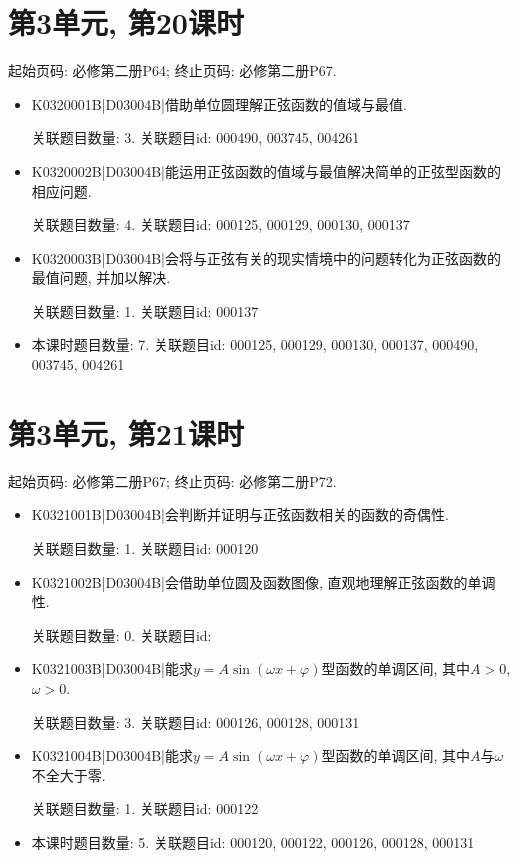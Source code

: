 \section*{第3单元, 第20课时}
起始页码: 必修第二册P64; 终止页码: 必修第二册P67.
\begin{itemize}
\item K0320001B|D03004B|借助单位圆理解正弦函数的值域与最值.

关联题目数量: 3. 关联题目id: 000490, 003745, 004261

\item K0320002B|D03004B|能运用正弦函数的值域与最值解决简单的正弦型函数的相应问题.

关联题目数量: 4. 关联题目id: 000125, 000129, 000130, 000137

\item K0320003B|D03004B|会将与正弦有关的现实情境中的问题转化为正弦函数的最值问题, 并加以解决.

关联题目数量: 1. 关联题目id: 000137

\item 本课时题目数量: 7. 关联题目id: 000125, 000129, 000130, 000137, 000490, 003745, 004261

\end{itemize}

\section*{第3单元, 第21课时}
起始页码: 必修第二册P67; 终止页码: 必修第二册P72.
\begin{itemize}
\item K0321001B|D03004B|会判断并证明与正弦函数相关的函数的奇偶性.

关联题目数量: 1. 关联题目id: 000120

\item K0321002B|D03004B|会借助单位圆及函数图像, 直观地理解正弦函数的单调性.

关联题目数量: 0. 关联题目id: 

\item K0321003B|D03004B|能求$y=A\sin(\omega x+\varphi)$型函数的单调区间, 其中$A>0$, $\omega>0$.

关联题目数量: 3. 关联题目id: 000126, 000128, 000131

\item K0321004B|D03004B|能求$y=A\sin(\omega x+\varphi)$型函数的单调区间, 其中$A$与$\omega$不全大于零.

关联题目数量: 1. 关联题目id: 000122

\item 本课时题目数量: 5. 关联题目id: 000120, 000122, 000126, 000128, 000131

\end{itemize}

